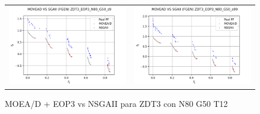 \begin{figure}[H]
\begin{tabular}{c c}
    \includegraphics[scale=0.5]{figures/ZDT3_EOP3_N80_G50_T12/s9_comp.png} &
    \includegraphics[scale=0.5]{figures/ZDT3_EOP3_N80_G50_T12/s99_comp.png}\\
    \end{tabular}
    \caption{\centering MOEA/D + EOP3 vs NSGAII para ZDT3 con N80 G50 T12}
    \label{fig:15}
\end{figure}
